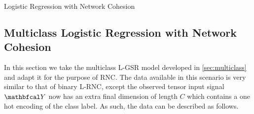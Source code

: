 \begin{algorithm}[ht]
\begin{algorithmic}
    \State{$\muu \leftarrow \one / \one + \exp\big(-\big[\I_N \;\; \X \big] \thetaa \big)$}
    \vspace{0.15cm}
    \vspace{0.15cm}
    \vspace{0.15cm}
    \vspace{0.15cm}
    \vspace{0.15cm}
    \State{$\tee \leftarrow \begin{bmatrix}
        \D_\St \\ \X^\top \D_\St
    \end{bmatrix} \left(\y - \muu + \D_{\muu} \big[\I_N \;\; \X \big] \thetaa \right)$}
    \vspace{0.15cm}
    \vspace{0.15cm}
    \vspace{0.15cm}
    \EndWhile
    \vspace{0.25cm}
    \State{$\muu \leftarrow \one / \one + \exp\big(-\big[\I_N \;\; \X \big] \thetaa \big)$ }
    \vspace{0.15cm}
    \end{algorithmic}
    \caption{Logistic Regression with Network Cohesion}
    \label{al:LRNC}
\end{algorithm}

\subsection{Multiclass Logistic Regression with Network Cohesion}

In this section we take the multiclass L-GSR model developed in \cref{sec:multiclass} and adapt it for the purpose of RNC. The data available in this scenario is very similar to that of binary L-RNC, except the observed tensor input signal $\Yt$ now has an extra final dimension of length $C$ which contains a one hot encoding of the class label. As such, the data can be described as follows. 

